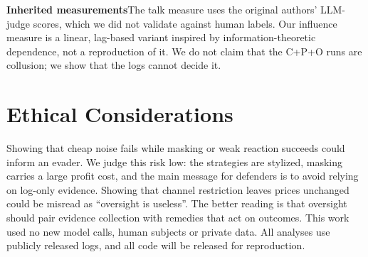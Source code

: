 \documentclass[10pt]{article}
\newcommand{\para}[1]{\textbf{#1}\hspace{0.45em}}
\begin{document}
\para{Inherited measurements}The talk measure uses the original authors' LLM-judge scores, which we did not validate against human labels. Our influence measure is a linear, lag-based variant inspired by information-theoretic dependence, not a reproduction of it. We do not claim that the C+P+O runs are collusion; we show that the logs cannot decide it.

\section*{Ethical Considerations}
Showing that cheap noise fails while masking or weak reaction succeeds could inform an evader. We judge this risk low: the strategies are stylized, masking carries a large profit cost, and the main message for defenders is to avoid relying on log-only evidence. Showing that channel restriction leaves prices unchanged could be misread as ``oversight is useless''. The better reading is that oversight should pair evidence collection with remedies that act on outcomes. This work used no new model calls, human subjects or private data. All analyses use publicly released logs, and all code will be released for reproduction.
\end{document}
